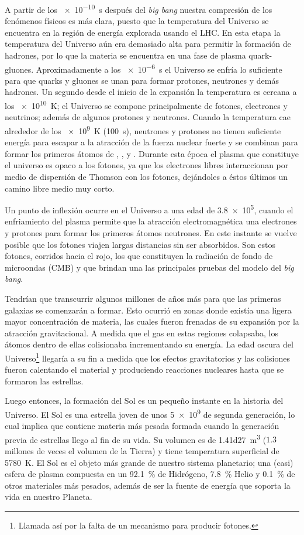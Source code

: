 A partir de los \SI{e-10}{\second} después del \emph{big bang} nuestra compresión de los fenómenos físicos es más clara, puesto que la temperatura del Universo se encuentra en la región de energía explorada usando el LHC. En esta etapa la temperatura del Universo aún era demasiado alta para permitir la formación de hadrones, por lo que la materia se encuentra en una fase de plasma quark-gluones. Aproximadamente a los \SI{e-6}{\second} el Universo se enfría lo suficiente para que quarks y gluones se unan para formar protones, neutrones y demás hadrones. Un segundo desde el inicio de la expansión la temperatura es cercana a los \SI{e10}{\kelvin}; el Universo se compone principalmente de fotones, electrones y neutrinos; además de algunos protones y neutrones. Cuando la temperatura cae alrededor de los \SI{e9}{\kelvin} (\SI{100}{\second}), neutrones y protones no tienen suficiente energía para escapar a la atracción de la fuerza nuclear fuerte y se combinan para formar los primeros átomos de , ,  y . Durante esta época el plasma que constituye el universo es opaco a los fotones, ya que los electrones libres interaccionan por medio de dispersión de Thomson con los fotones, dejándoles a éstos últimos un camino libre medio muy corto.

Un punto de inflexión ocurre en el Universo a una edad de \SI{3.8e5}{\year}, cuando el enfriamiento del plasma permite que la atracción electromagnética una electrones y protones para formar los primeros átomos neutrones. En este instante se vuelve posible que los fotones viajen largas distancias sin ser absorbidos. Son estos fotones, corridos hacia el rojo, los que constituyen la radiación de fondo de microondas (CMB) y que brindan una las principales pruebas del modelo del \emph{big bang}.

Tendrían que transcurrir algunos millones de años más para que las primeras galaxias se comenzarán a formar. Esto ocurrió en zonas donde existía una ligera mayor concentración de materia, las cuales fueron frenadas de su expansión por la atracción gravitacional. A medida que el gas en estas regiones colapsaba, los átomos dentro de ellas colisionaba incrementando su energía. La edad oscura del Universo\footnote{Llamada así por la falta de un mecanismo para producir fotones.} llegaría a su fin a medida que los efectos gravitatorios y las colisiones fueron calentando el material y produciendo reacciones nucleares hasta que se formaron las estrellas.

Luego entonces, la formación del Sol es un pequeño instante en la historia del Universo. El Sol es una estrella joven de unos \SI{5e9}{\year} de segunda generación, lo cual implica que contiene materia más pesada formada cuando la generación previa de estrellas llego al fin de su vida. Su volumen es de \SI{1.41d27}{\cubic\metre} ($1.3$ millones de veces el volumen de la Tierra) y tiene temperatura superficial de \SI{5780}{\kelvin}. El Sol es el objeto más grande de nuestro sistema planetario; una (casi) esfera de plasma compuesta en un \SI{92.1}{\percent} de Hidrógeno, \SI{7.8}{\percent} Helio y \SI{0.1}{\percent} de otros materiales más pesados, además de ser la fuente de energía que soporta la vida en nuestro Planeta.

